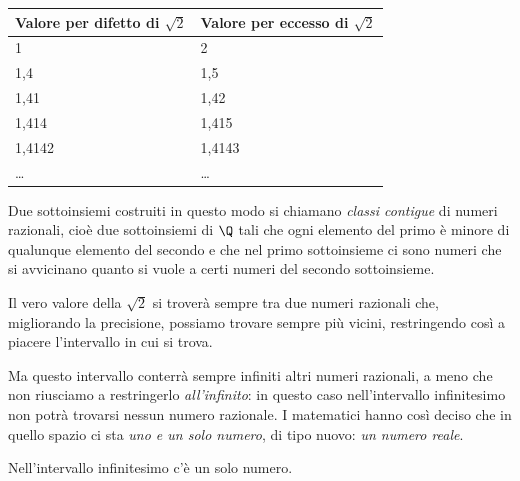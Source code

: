 \begin{center} 
\begin{tabular}{ll} 
\toprule Valore per difetto di \(\sqrt{2}\) 
&Valore per eccesso di \(\sqrt{2}\) \\ 
\midrule 
1& 2\\ 
1,4& 1,5 \\ 
1,41& 1,42\\ 
1,414& 1,415\\ 
1,4142& 1,4143\\ 
\ldots& \ldots\\ 
\bottomrule \end{tabular} 
\end{center}

Due sottoinsiemi costruiti in questo modo si chiamano \emph{classi contigue} di 
numeri razionali, cioè due sottoinsiemi di \(\Q\) tali che ogni elemento del 
primo è minore di qualunque elemento del secondo e che nel primo sottoinsieme ci 
sono numeri che si avvicinano quanto si vuole a certi numeri del secondo 
sottoinsieme.

Il vero valore della  \(\sqrt{2}\) si troverà sempre tra due numeri razionali che, 
migliorando la precisione, possiamo trovare sempre più vicini, restringendo così
a piacere l'intervallo in cui si trova. 

{\noindent
\begin{minipage}{.28\textwidth}
Ma questo intervallo conterrà sempre infiniti altri numeri 
razionali, a meno che non riusciamo a restringerlo \emph{all'infinito}: in 
questo caso nell'intervallo infinitesimo non potrà trovarsi nessun numero 
razionale.
I matematici hanno così deciso che in quello spazio ci sta \emph{uno 
e un solo numero}, di tipo nuovo: \emph{un numero reale}.
\end{minipage}
\hfill
\begin{minipage}{.70\textwidth}
\begin{inaccessibleblock} 
\begin{center}
\unoconnome 
{\footnotesize Nell'intervallo infinitesimo c'è un solo numero.} 
\end{center}
\label{fig:mandelbrot} 
\end{inaccessibleblock} 
\end{minipage}
}




